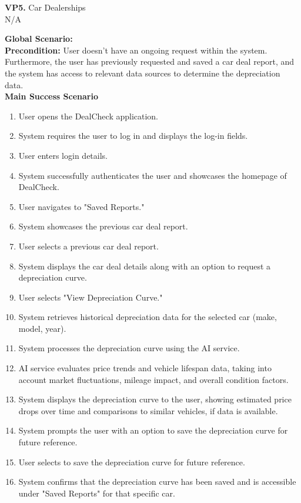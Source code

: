 \documentclass[]{article}
\begin{document}
\begin{enumerate}[{\bf {BE}1.}]
		\textbf{VP5.} Car Dealerships \\ N/A  
	
	{\bf Global Scenario:}\\
	{\bf Precondition:} User doesn't have an ongoing request within the system. Furthermore, the user has previously requested and saved a car deal report, and the system 
	has access to relevant data sources to determine the depreciation data. \\

	{\bf Main Success Scenario}
	\begin{enumerate}[1.]
		\item User opens the DealCheck application.
		\item System requires the user to log in and displays the log-in fields.
		\item User enters login details.
		\item System successfully authenticates the user and showcases the homepage of DealCheck.
		\item User navigates to "Saved Reports."
		\item System showcases the previous car deal report.
		\item User selects a previous car deal report.
		\item System displays the car deal details along with an option to request a depreciation curve.
		\item User selects "View Depreciation Curve."
		\item System retrieves historical depreciation data for the selected car (make, model, year).
		\item System processes the depreciation curve using the AI service.
		\item AI service evaluates price trends and vehicle lifespan data, taking into account market fluctuations, mileage impact, and overall condition factors.
		\item System displays the depreciation curve to the user, showing estimated price drops over time and comparisons to similar vehicles, if data is available.
		\item System prompts the user with an option to save the depreciation curve for future reference.
		\item User selects to save the depreciation curve for future reference.
		\item System confirms that the depreciation curve has been saved and is accessible under "Saved Reports" for that specific car.
	\end{enumerate}


\end{enumerate}
\end{document}
